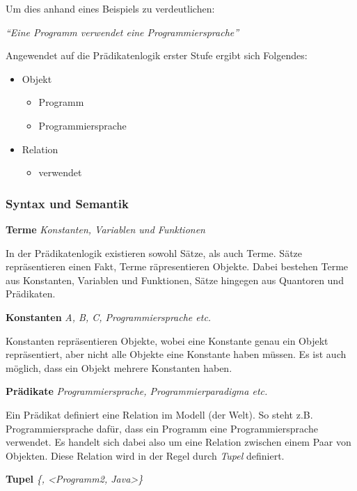 \newpage

Um dies anhand eines Beispiels zu verdeutlichen:

    \noindent\hspace*{12mm}\textit{``Eine Programm verwendet eine Programmiersprache''}

Angewendet auf die Prädikatenlogik erster Stufe ergibt sich Folgendes:

\begin{itemize}
    \item{Objekt}
    \begin{itemize}
        \item{Programm}
        \item{Programmiersprache}
    \end{itemize}
    \item{Relation}
    \begin{itemize}
        \item{verwendet}
    \end{itemize}
\end{itemize}

\subsubsection{Syntax und Semantik}
\label{subsubsec:syntax-und-semantik}

\textbf{Terme} \textit{Konstanten, Variablen und Funktionen}

In der Prädikatenlogik existieren sowohl Sätze, als auch Terme. Sätze repräsentieren einen Fakt, Terme räpresentieren Objekte. Dabei bestehen Terme aus Konstanten, Variablen und Funktionen, Sätze hingegen aus Quantoren und Prädikaten.


\textbf{Konstanten} \textit{A, B, C, Programmiersprache etc.}

Konstanten repräsentieren Objekte, wobei eine Konstante genau ein Objekt repräsentiert, aber nicht alle Objekte eine Konstante haben müssen. Es ist auch möglich, dass ein Objekt mehrere Konstanten haben.


\textbf{Prädikate} \textit{Programmiersprache, Programmierparadigma etc.}

Ein Prädikat definiert eine Relation im Modell (der Welt). So steht z.B. Programmiersprache dafür, dass ein Programm eine Programmiersprache verwendet. Es handelt sich dabei also um eine Relation zwischen einem Paar von Objekten. Diese Relation wird in der Regel durch \textit{Tupel} definiert.


\textbf{Tupel} \textit{\{<Programm1, Prolog>, <Programm2, Java>\}}

